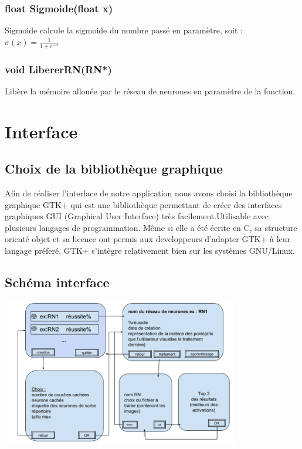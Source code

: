 \documentclass{article}
\begin{document}
		\subsubsection{\textcolor{myblue}{\textbf{float}} Sigmoide(\textcolor{myblue}{\textbf{float}} x)}
		Sigmoide calcule la sigmoide du nombre passé en paramètre, soit : \\
		$\sigma(x) = \frac{1}{1+e^{-x}}$
		
		\subsubsection{\textcolor{myblue}{\textbf{void}} LibererRN(\textcolor{myblue}{\textbf{RN*}})}
		Libère la mémoire allouée par le réseau de neurones en paramètre de la fonction.
		
	\section{Interface}
		\subsection{Choix de la bibliothèque graphique }
			Afin de réaliser l'interface de notre application nous avons choisi la bibliothèque graphique GTK+ qui est une bibliothèque permettant de créer des interfaces graphiques GUI (Graphical User Interface) très facilement.Utilisable avec plusieurs langages de programmation.
		Même si elle a été écrite en C, sa structure orienté objet et sa licence ont permis aux developpeurs d'adapter GTK+ à leur langage préferé. GTK+ s'intègre relativement bien sur les systèmes GNU/Linux.
		\subsection{Schéma interface}
			\begin{center} 
				\includegraphics[height=244, width=400]{cap.PNG}
			\end{center}
\end{document}

